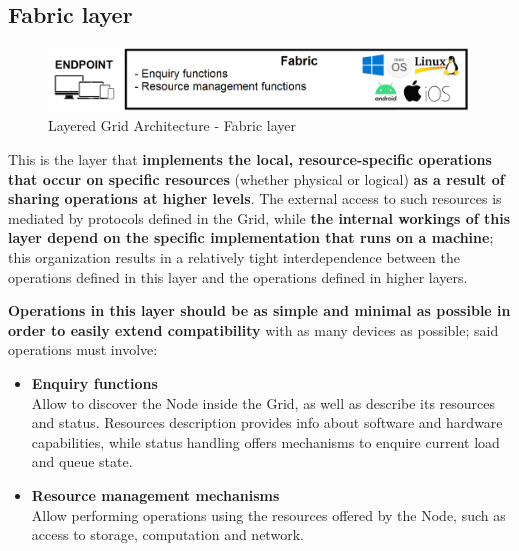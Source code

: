 \subsection{Fabric layer}
\begin{figure}[!ht]
    \centering
    \includegraphics[scale=0.35]{document/chapters/chapter_2/images/fabric_layer.png}
    \caption{Layered Grid Architecture - Fabric layer}
    \label{fig:fabric_layer}
\end{figure}

\noindent This is the layer that \textbf{implements the local, resource-specific operations that occur on specific resources} (whether physical or logical) \textbf{as a result of sharing operations at higher levels}. The external access to such resources is mediated by protocols defined in the Grid, while \textbf{the internal workings of this layer depend on the specific implementation that runs on a machine}; this organization results in a relatively tight interdependence between the operations defined in this layer and the operations defined in higher layers.
\vspace{30mm}

\textbf{Operations in this layer should be as simple and minimal as possible in order to easily extend compatibility} with as many devices as possible; said operations must involve:
\begin{itemize}
    \item \textbf{Enquiry functions}\\
    Allow to discover the Node inside the Grid, as well as describe its resources and status. Resources description provides info about software and hardware capabilities, while status handling offers mechanisms to enquire current load and queue state.
    \item \textbf{Resource management mechanisms}\\
    Allow performing operations using the resources offered by the Node, such as access to storage, computation and network.
\end{itemize} 
\vspace{5mm}

